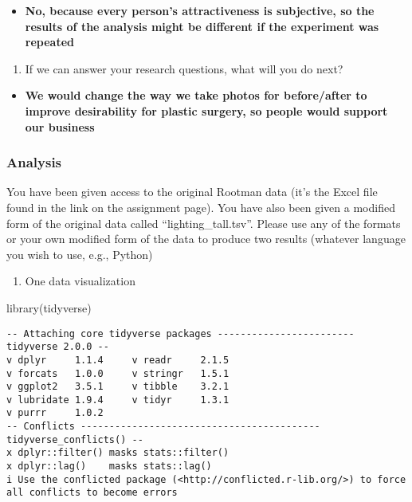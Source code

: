 \documentclass[
  letterpaper,
  DIV=11,
  numbers=noendperiod]{scrartcl}
\newenvironment{Shaded}{\begin{snugshade}}{\end{snugshade}}
\newcommand{\FunctionTok}[1]{\textcolor[rgb]{0.28,0.35,0.67}{#1}}
\newcommand{\NormalTok}[1]{\textcolor[rgb]{0.00,0.23,0.31}{#1}}
\providecommand{\tightlist}{%
  \setlength{\itemsep}{0pt}\setlength{\parskip}{0pt}}\usepackage{longtable,booktabs,array}
\begin{document}
\begin{itemize}
\tightlist
\item
  \textbf{No, because every person's attractiveness is subjective, so
  the results of the analysis might be different if the experiment was
  repeated}
\end{itemize}

\begin{enumerate}
\def\labelenumi{\arabic{enumi}.}
\setcounter{enumi}{2}
\tightlist
\item
  If we can answer your research questions, what will you do next?\\
\end{enumerate}

\begin{itemize}
\tightlist
\item
  \textbf{We would change the way we take photos for before/after to
  improve desirability for plastic surgery, so people would support our
  business}
\end{itemize}

\subsubsection{Analysis}\label{analysis}

You have been given access to the original Rootman data (it's the Excel
file found in the link on the assignment page). You have also been given
a modified form of the original data called ``lighting\_tall.tsv''.
Please use any of the formats or your own modified form of the data to
produce two results (whatever language you wish to use, e.g., Python)

\begin{enumerate}
\def\labelenumi{\arabic{enumi}.}
\tightlist
\item
  One data visualization
\end{enumerate}

\begin{Shaded}
\begin{Highlighting}[]
\FunctionTok{library}\NormalTok{(tidyverse)}
\end{Highlighting}
\end{Shaded}

\begin{verbatim}
-- Attaching core tidyverse packages ------------------------ tidyverse 2.0.0 --
v dplyr     1.1.4     v readr     2.1.5
v forcats   1.0.0     v stringr   1.5.1
v ggplot2   3.5.1     v tibble    3.2.1
v lubridate 1.9.4     v tidyr     1.3.1
v purrr     1.0.2     
-- Conflicts ------------------------------------------ tidyverse_conflicts() --
x dplyr::filter() masks stats::filter()
x dplyr::lag()    masks stats::lag()
i Use the conflicted package (<http://conflicted.r-lib.org/>) to force all conflicts to become errors
\end{verbatim}
\end{document}
